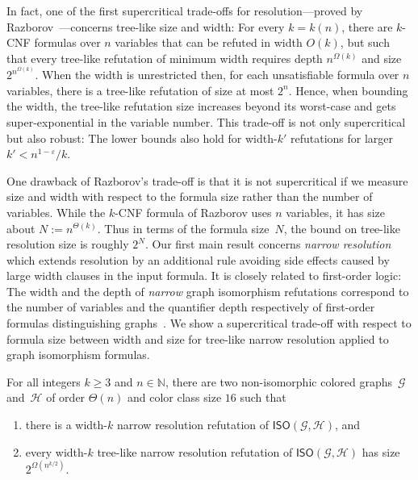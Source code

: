 \documentclass[a4paper,english, thm-restate]{lipics-v2021}
\newcommand{\nat}{\mathbb{N}}
\newcommand{\graphG}{\mathcal{G}}
\newcommand{\graphH}{\mathcal{H}}
\newcommand{\ISO}{\mathsf{ISO}(\graphG, \graphH)}
\begin{document}
In fact,
one of
the first supercritical trade-offs for resolution---proved by Razborov~\cite{DBLP:journals/jacm/Razborov16}---concerns tree-like size and width:
For every $k=k(n)$,
there are $k$-CNF formulas over $n$ variables that can be refuted
in width $O(k)$, but such that every tree-like refutation of minimum width
requires depth $n^{\Omega(k)}$ and size
$2^{n^{\Omega(k)}}$.
When the width is unrestricted then, for each unsatisfiable formula over $n$ variables, there is a tree-like refutation of size at most $2^n$.
Hence, when bounding the width, the tree-like refutation size increases beyond its worst-case and gets super-exponential in the variable number.
This trade-off is not only supercritical but also robust:
The lower bounds also hold for
width-$k'$ refutations for larger $k' < n^{1-\varepsilon}/k$.

One drawback of Razborov's trade-off is that it is not supercritical if we measure size and width with respect to the formula size rather than the number of variables.
While the $k$-CNF formula of Razborov uses $n$ variables, it has size
about $N := n^{\Theta(k)}$.
Thus in terms of the formula size~$N$, the bound on tree-like resolution size is roughly $2^N$.
%
%
Our first main result concerns
\emph{narrow resolution}~\cite{DBLP:conf/sat/GalesiT05} which extends resolution by an additional rule
avoiding side effects caused by large width clauses in the input formula.
It is closely related to first-order logic: The  width
and the depth of
\emph{narrow} graph isomorphism refutations correspond to the number of variables and the quantifier depth respectively of first-order formulas distinguishing graphs~\cite{DBLP:conf/sat/ToranW23}.
%
%
%
%
%
%
%
%
%
%
%
%
We show a supercritical trade-off with respect to formula size between width and size for tree-like narrow resolution applied to graph isomorphism formulas. 

\begin{theorem}
        \label{thm: lowerbound-treelike-refutation-narrow-width-non-robust}
        For all integers $k \geq 3$ and $n \in \nat$,
        there are two non-isomorphic colored graphs~$\graphG$ and~$\graphH$ of order $\Theta(n)$ and color class size $16$ such that
        \begin{enumerate}
                \item there is a width-$k$ narrow resolution refutation of $\ISO$, and
                \item every width-$k$ tree-like narrow resolution refutation of $\ISO$ has size $2^{\Omega(n^{k/2})}$.
        \end{enumerate}
\end{theorem}
\end{document}
